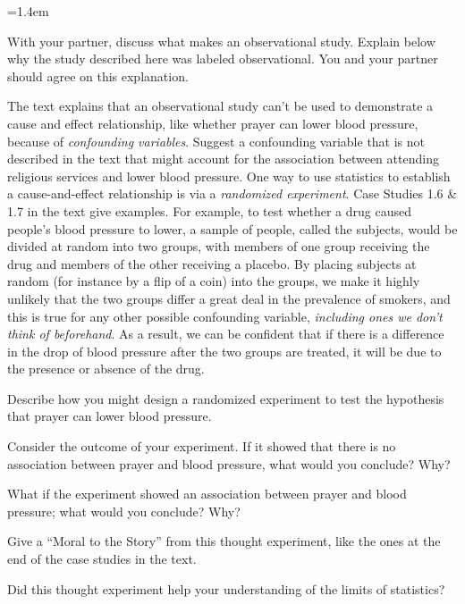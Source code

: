 \documentclass[12pt]{amsart}
\begin{document}
\begin{list}
{}
{\leftmargin=1.4em}
\item With your partner, discuss what makes an observational study. Explain below why the study described here was labeled observational. You and your partner should agree on this explanation.
\vspace{2.5in}
\item The text explains that an observational study can't be used to demonstrate a cause and effect relationship, like whether prayer can lower blood pressure, because of {\it confounding variables}. Suggest a confounding variable that is not described in the text that might account for the association between attending religious services and lower blood pressure.
\newpage
One way to use statistics to establish a cause-and-effect relationship is via a {\it randomized experiment}. Case Studies 1.6 \& 1.7 in the text give examples. For example, to test whether a drug caused people's blood pressure to lower, a sample of people, called the subjects, would be divided at random into two groups, with members of one group receiving the drug and members of the other receiving a placebo. By placing subjects at random (for instance by a flip of a coin) into the groups, we make it highly unlikely that the two groups differ a great deal in the prevalence of smokers, and this is true for any other possible confounding variable, {\it including ones we don't think of beforehand}. As a result, we can be confident that if there is a difference in the drop of blood pressure after the two groups are treated, it will be due to the presence or absence of the drug.
\item Describe how you might design a randomized experiment to test the hypothesis that prayer can lower blood pressure.
\bigskip\bigskip\bigskip\vfill
\item Consider the outcome of your experiment. If it showed that there is no association between prayer and blood pressure, what would you conclude? Why?
\bigskip\bigskip\bigskip\vfill
\item What if the experiment showed an association between prayer and blood pressure; what would you conclude? Why?
\bigskip\bigskip\bigskip\vfill
\item Give a ``Moral to the Story'' from this thought experiment, like the ones at the end of the case studies in the text.
\bigskip\bigskip\bigskip\vfill
\item Did this thought experiment help your understanding of the limits of statistics?
\bigskip\bigskip\bigskip

\end{list}
\end{document}
